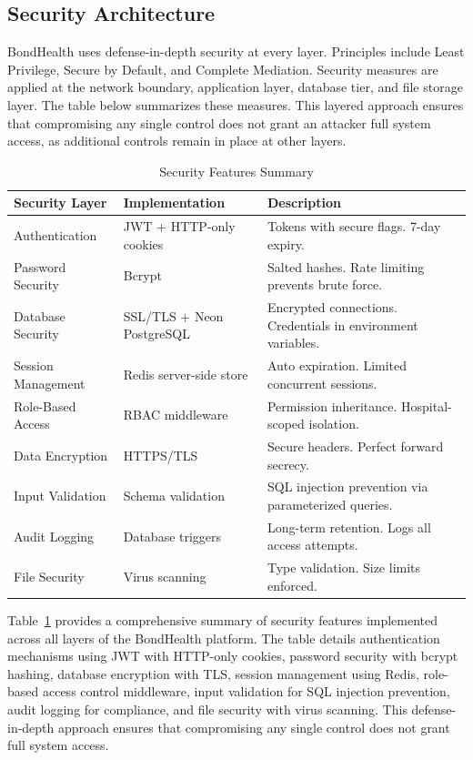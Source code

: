 \subsection{Security Architecture}

\justifying
\noindent BondHealth uses defense-in-depth security at every layer. Principles include Least Privilege, Secure by Default, and Complete Mediation. Security measures are applied at the network boundary, application layer, database tier, and file storage layer. The table below summarizes these measures. This layered approach ensures that compromising any single control does not grant an attacker full system access, as additional controls remain in place at other layers.

\begin{table}[H]
\small
\centering
\caption{Security Features Summary}
\label{tab:ch4-security}
\renewcommand{\arraystretch}{1.3}
\begin{tabular}{|>{\raggedright\arraybackslash}p{2.8cm}|>{\raggedright\arraybackslash}p{3.8cm}|>{\raggedright\arraybackslash}p{6.8cm}|}
\hline
\textbf{Security Layer} & \textbf{Implementation} & \textbf{Description} \\
\hline
Authentication & JWT + HTTP-only cookies & Tokens with secure flags. 7-day expiry. \\
\hline
Password Security & Bcrypt & Salted hashes. Rate limiting prevents brute force. \\
\hline
Database Security & SSL/TLS + Neon PostgreSQL & Encrypted connections. Credentials in environment variables. \\
\hline
Session Management & Redis server-side store & Auto expiration. Limited concurrent sessions. \\
\hline
Role-Based Access & RBAC middleware & Permission inheritance. Hospital-scoped isolation. \\
\hline
Data Encryption & HTTPS/TLS & Secure headers. Perfect forward secrecy. \\
\hline
Input Validation & Schema validation & SQL injection prevention via parameterized queries. \\
\hline
Audit Logging & Database triggers & Long-term retention. Logs all access attempts. \\
\hline
File Security & Virus scanning & Type validation. Size limits enforced. \\
\hline
\end{tabular}
\end{table}
\noindent Table~\ref{tab:ch4-security} provides a comprehensive summary of security features implemented across all layers of the BondHealth platform. The table details authentication mechanisms using JWT with HTTP-only cookies, password security with bcrypt hashing, database encryption with TLS, session management using Redis, role-based access control middleware, input validation for SQL injection prevention, audit logging for compliance, and file security with virus scanning. This defense-in-depth approach ensures that compromising any single control does not grant full system access.
\FloatBarrier

